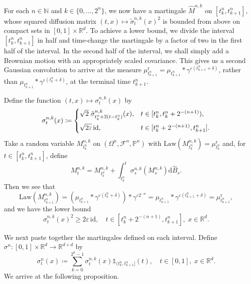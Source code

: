 \documentclass[12pt,oneside]{amsart}
\theoremstyle{definition}
\newcommand{\F}{\mathcal F}
\newcommand{\Law}{\mathrm{Law}}
\newcommand{\id}{\mathrm{id}}
\newcommand{\D}{\mathrm{d}}
\newcommand{\N}{\mathbb N}
\newcommand{\R}{\mathbb R}
\newcommand{\reg}{\mathrm{r}}
\def\P{{\mathbb P}}
\def\R{{\mathbb R}}
\numberwithin{equation}{section}
\begin{document}
For each $n \in \N$ and $k \in \{0, \dotsc, 2^n\}$, we now have a martingale $\hat{M}^{n, k}$ on $[t^n_k, t^n_{k + 1}]$, whose squared diffusion matrix $(t, x) \mapsto \tilde \sigma^{n, k}_t(x)^2$ is bounded from above on compact sets in $[0, 1] \times \R^d$. To achieve a lower bound, we divide the interval $[t^n_k, t^n_{k + 1}]$ in half and time-change the martingale by a factor of two in the first half of the interval. In the second half of the interval, we shall simply add a Brownian motion with an appropriately scaled covariance. This gives us a second Gaussian convolution to arrive at the measure $\mu^\reg_{t^n_{k +1}} = \mu_{t^n_{k + 1}} \ast \gamma^{\varepsilon(t^n_{k +1} + \delta)}$, rather than $\mu_{t^n_{k + 1}} \ast \gamma^{\varepsilon(t^n_k + \delta)}$, at the terminal time $t^n_{k+1}$.

Define the function $(t, x) \mapsto \sigma^{n, k}_t(x)$ by
\begin{equation}\label{eq:sigma-splitting-interval}
	\sigma^{n, k}_t(x) \coloneqq
	\begin{cases}
		\sqrt{2}\; \tilde{\sigma}^{n, k}_{t^n_k + 2(t - t^n_k)}(x), & t \in [t^n_k, t^n_k + 2^{-(n+1)}),\vspace{1ex}\\
		\sqrt{2\varepsilon} \, \id, & t \in [t^n_k + 2^{-(n + 1)}, t^n_{k+1}].
	\end{cases}
\end{equation}
Take a random variable $M^{n, k}_{t^n_k}$ on $(\Omega^n, \F^n, \P^n)$ with $\Law(M^{n, k}_{t^n_k}) = \mu^\reg_{t^n_k}$ and, for $t \in [t^n_k, t^n_{k +1}]$, define
\begin{equation}
	M^{n, k}_t = M^{n, k}_{t^n_k} + \int_{t^n_k}^t \sigma^{n, k}_s(M^{n, k}_s) \D \hat B_s.
\end{equation}
Then we see that
\begin{equation}\label{eq:dyadic-law}
	\Law(M^{n, k}_{t^n_{k+1}}) = (\mu_{t^n_{k + 1}} \ast \gamma^{\varepsilon (t^n_k + \delta)}) \ast \gamma^{\varepsilon2^{-n}} = \mu_{t^n_{k + 1}} \ast \gamma^{\varepsilon (t^n_{k+1} + \delta)} = \mu^\reg_{t^n_{k + 1}},
\end{equation}
and we have the lower bound
\begin{equation}\label{eq:lower-bound}
	\sigma^{n, k}_t(x)^2 \geq 2 \varepsilon \, \id, \quad t \in [t^n_k + 2^{-(n + 1)}, t^n_{k + 1}], \; x \in \R^d.
\end{equation}

We next paste together the martingales defined on each interval. Define $\sigma^{n} \colon [0, 1] \times \R^d \to \R^{d \times d}$ by
\begin{equation}
	\sigma^{n}_t(x) \coloneqq \sum_{k = 0}^{2^n - 1} \sigma^{n, k}_t(x) \mathds{1}_{(t^n_k, t^n_{k +1}]}(t), \quad t \in [0, 1], \; x \in \R^d.
\end{equation}
We arrive at the following proposition.
\end{document}
